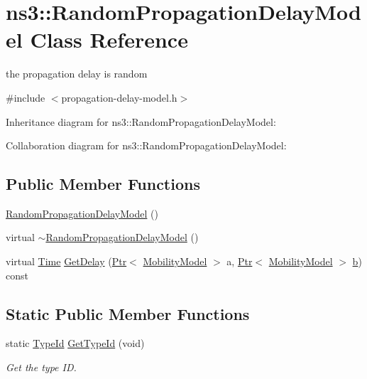 \hypertarget{classns3_1_1RandomPropagationDelayModel}{}\section{ns3\+:\+:Random\+Propagation\+Delay\+Model Class Reference}
\label{classns3_1_1RandomPropagationDelayModel}


the propagation delay is random  




{\ttfamily \#include $<$propagation-\/delay-\/model.\+h$>$}



Inheritance diagram for ns3\+:\+:Random\+Propagation\+Delay\+Model\+:


Collaboration diagram for ns3\+:\+:Random\+Propagation\+Delay\+Model\+:
\subsection*{Public Member Functions}
\begin{DoxyCompactItemize}
\item 
\hyperlink{classns3_1_1RandomPropagationDelayModel_a0d1c542e88c544cecdd4dd1443771985}{Random\+Propagation\+Delay\+Model} ()
\item 
virtual \hyperlink{classns3_1_1RandomPropagationDelayModel_a1777db1e8ca0753f178d325d2a612fc3}{$\sim$\+Random\+Propagation\+Delay\+Model} ()
\item 
virtual \hyperlink{classns3_1_1Time}{Time} \hyperlink{classns3_1_1RandomPropagationDelayModel_a34e6b680eb47894f3a40d765ed1ed1bf}{Get\+Delay} (\hyperlink{classns3_1_1Ptr}{Ptr}$<$ \hyperlink{classns3_1_1MobilityModel}{Mobility\+Model} $>$ a, \hyperlink{classns3_1_1Ptr}{Ptr}$<$ \hyperlink{classns3_1_1MobilityModel}{Mobility\+Model} $>$ \hyperlink{lte__pathloss_8m_a21ad0bd836b90d08f4cf640b4c298e7c}{b}) const 
\end{DoxyCompactItemize}
\subsection*{Static Public Member Functions}
\begin{DoxyCompactItemize}
\item 
static \hyperlink{classns3_1_1TypeId}{Type\+Id} \hyperlink{classns3_1_1RandomPropagationDelayModel_a9c7cf9bc0a701d5b71c2d7b08a5bca57}{Get\+Type\+Id} (void)
\begin{DoxyCompactList}\small\item\em Get the type ID. \end{DoxyCompactList}\end{DoxyCompactItemize}
